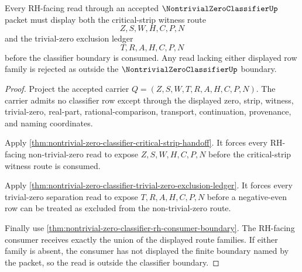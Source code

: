 

\begin{theorem}
\label{thm:nontrivial-zero-classifier-falsifiable-boundary}
Every RH-facing read through an accepted $\NontrivialZeroClassifierUp$ packet must display both the critical-strip witness route
$$
Z,S,W,H,C,P,N
$$
and the trivial-zero exclusion ledger
$$
T,R,A,H,C,P,N
$$
before the classifier boundary is consumed. Any read lacking either displayed row family is rejected as outside the $\NontrivialZeroClassifierUp$ boundary.
\end{theorem}
\begin{proof}
Project the accepted carrier $Q=(Z,S,W,T,R,A,H,C,P,N)$. The carrier admits no classifier row except through the displayed zero, strip, witness, trivial-zero, real-part, rational-comparison, transport, continuation, provenance, and naming coordinates.

Apply \autoref{thm:nontrivial-zero-classifier-critical-strip-handoff}. It forces every RH-facing non-trivial-zero read to expose $Z,S,W,H,C,P,N$ before the critical-strip witness route is consumed.

Apply \autoref{thm:nontrivial-zero-classifier-trivial-zero-exclusion-ledger}. It forces every trivial-zero separation read to expose $T,R,A,H,C,P,N$ before a negative-even row can be treated as excluded from the non-trivial-zero route.

Finally use \autoref{thm:nontrivial-zero-classifier-rh-consumer-boundary}. The RH-facing consumer receives exactly the union of the displayed route families. If either family is absent, the consumer has not displayed the finite boundary named by the packet, so the read is outside the classifier boundary.
\end{proof}

